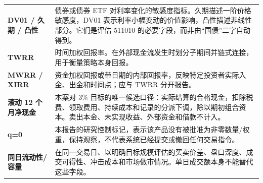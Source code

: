 \begin{longtable}{L{3.0cm}L{11.5cm}}
\textbf{DV01 / 久期 / 凸性} & 债券或债券 ETF 对利率变化的敏感度指标。久期描述一阶价格敏感度，DV01 表示利率小幅变动的价值影响，凸性描述非线性部分。它们是评估 511010 的必要字段，而非由“国债”二字自动得到。\\
\textbf{TWRR} & 时间加权回报率。在外部现金流发生时划分子期间并链式连接，用于衡量策略本身回报。\\
\textbf{MWRR / XIRR} & 资金加权回报或带日期的内部回报率，反映特定投资者实际入金、出金和时间点；应与 TWRR 分开报告。\\
\textbf{滚动 12 个月净现金} & 本案对 3\% 目标的唯一候选口径：实际结算的合格现金，扣除税费、领取费用、持续成本和记录的分派下调，除以期初组合资本。卖出本金、未实现收益、外部资金和借款不计入。\\
\textbf{q=0} & 本报告的研究控制标记，表示该产品没有被批准为非零数量/权重，保持观察，不代表系统已经提交或撤回任何交易指令。\\
\textbf{同日流动性/容量} & 在同一交易日、以明确目标规模评估的买卖价差、盘口深度、成交可得性、冲击成本和市场做市情况。单日成交额本身不能替代这些字段。\\
\bottomrule
\end{longtable}

